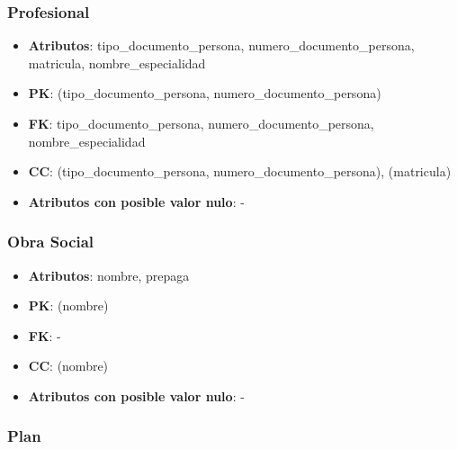 \documentclass[a4paper,11pt]{article}
\begin{document}
\subsubsection{\textbf{Profesional}}

\begin{itemize}

\item 
\textbf{Atributos}: tipo\_documento\_persona, numero\_documento\_persona, matricula,  nombre\_especialidad

\item 
\textbf{PK}: (tipo\_documento\_persona, numero\_documento\_persona)

\item
\textbf{FK}: tipo\_documento\_persona, numero\_documento\_persona, nombre\_especialidad

\item 
\textbf{CC}: (tipo\_documento\_persona, numero\_documento\_persona), (matricula)

\item 
\textbf{Atributos con posible valor nulo}: -

\end{itemize}

\subsubsection{\textbf{Obra Social}}

\begin{itemize}

\item 
\textbf{Atributos}: nombre, prepaga

\item 
\textbf{PK}: (nombre)

\item
\textbf{FK}: -

\item 
\textbf{CC}: (nombre)

\item 
\textbf{Atributos con posible valor nulo}: -

\end{itemize}

\subsubsection{\textbf{Plan}}
\end{document}
